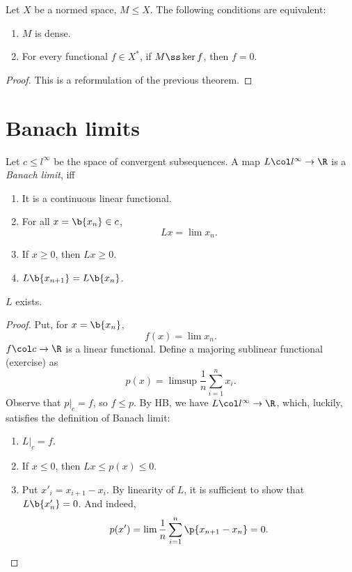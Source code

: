 \begin{corollary}
  Let $X$ be a normed space, $M \le X$.
  The following conditions are equivalent:
  \begin{enumerate}
    \item $M$ is dense.
    \item For every functional $f \in X^*$, if $M \ss \ker f$, then $f = 0$.
  \end{enumerate}
\end{corollary}

\begin{proof}
  This is a reformulation of the previous theorem.
\end{proof}

\section{Banach limits}

\begin{definition}
  Let $c \le l^\infty$ be the space of convergent subsequences.
  A map $L \col l^\infty \to \R$ is a \emph{Banach limit}, iff
  \begin{enumerate}
    \item It is a continuous linear functional.
    \item For all $x = \b{x_n} \in c$, $$ Lx = \lim x_n. $$
    \item If $x \ge 0$, then $Lx \ge 0$.
    \item $L\b{x_{n+1}} = L\b{x_n}$.
  \end{enumerate}
\end{definition}

\begin{theorem}
  $L$ exists.
\end{theorem}

\begin{proof}
  Put, for $x = \b{x_n}$,
  $$ f(x) = \lim x_n. $$
  $f \col c \to \R$ is a linear functional.
  Define a majoring sublinear functional (exercise) as
  $$ p(x) = \limsup \frac{1}{n} \sum_{i=1}^n x_i. $$
  Observe that $p|_c = f$, so $f \le p$.
  By HB, we have $L \col l^\infty \to \R$, which, luckily, satisfies the definition of Banach limit:
  \begin{enumerate}
    \item $L|_c = f$.
    \item If $x \le 0$, then $Lx \le p(x) \le 0$.
    \item Put $x'_i = x_{i+1}-x_i$. By linearity of $L$, it is sufficient to show that $L\b{x'_n} = 0$. And indeed,
      $$ p(x') = \lim \frac{1}{n} \sum_{i=1}^n \p{x_{n+1}-x_n} = 0. $$
  \end{enumerate}
\end{proof}

